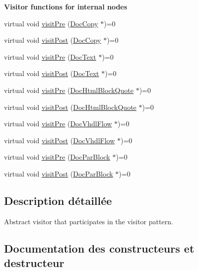 \begin{Indent}{\bf Visitor functions for internal nodes}
\begin{DoxyCompactItemize}
virtual void \hyperlink{class_doc_visitor_ae87294d2b9ebc20a211500e5fa354815}{visit\+Pre} (\hyperlink{class_doc_copy}{Doc\+Copy} $\ast$)=0
\item 
virtual void \hyperlink{class_doc_visitor_a345ac27dcfdd6629b0197aed47cc35f5}{visit\+Post} (\hyperlink{class_doc_copy}{Doc\+Copy} $\ast$)=0
\item 
virtual void \hyperlink{class_doc_visitor_ac80ffc5a1c2a5d4e83e9583d5b46fba5}{visit\+Pre} (\hyperlink{class_doc_text}{Doc\+Text} $\ast$)=0
\item 
virtual void \hyperlink{class_doc_visitor_ae8d32bfb6aedfcd8145075762fc1818a}{visit\+Post} (\hyperlink{class_doc_text}{Doc\+Text} $\ast$)=0
\item 
virtual void \hyperlink{class_doc_visitor_ae815fab40efb7e03356009ec05f4c8e0}{visit\+Pre} (\hyperlink{class_doc_html_block_quote}{Doc\+Html\+Block\+Quote} $\ast$)=0
\item 
virtual void \hyperlink{class_doc_visitor_a3057cb11ccd5ad3a108049a27c51ce94}{visit\+Post} (\hyperlink{class_doc_html_block_quote}{Doc\+Html\+Block\+Quote} $\ast$)=0
\item 
virtual void \hyperlink{class_doc_visitor_a2799c24ae52e00acca96bc5484b96c85}{visit\+Pre} (\hyperlink{class_doc_vhdl_flow}{Doc\+Vhdl\+Flow} $\ast$)=0
\item 
virtual void \hyperlink{class_doc_visitor_a201c6a9e58c9edbd48867c861cdb13d1}{visit\+Post} (\hyperlink{class_doc_vhdl_flow}{Doc\+Vhdl\+Flow} $\ast$)=0
\item 
virtual void \hyperlink{class_doc_visitor_a3545acbb5cf745cb1cb49aa237b53ead}{visit\+Pre} (\hyperlink{class_doc_par_block}{Doc\+Par\+Block} $\ast$)=0
\item 
virtual void \hyperlink{class_doc_visitor_a3c24f63acb77c3b728ee668067899b7d}{visit\+Post} (\hyperlink{class_doc_par_block}{Doc\+Par\+Block} $\ast$)=0
\end{DoxyCompactItemize}
\end{Indent}


\subsection{Description détaillée}
Abstract visitor that participates in the visitor pattern. 

\subsection{Documentation des constructeurs et destructeur}
\hypertarget{class_doc_visitor_a24962a0406b1d05920458f3d7d4fda8a}{}
